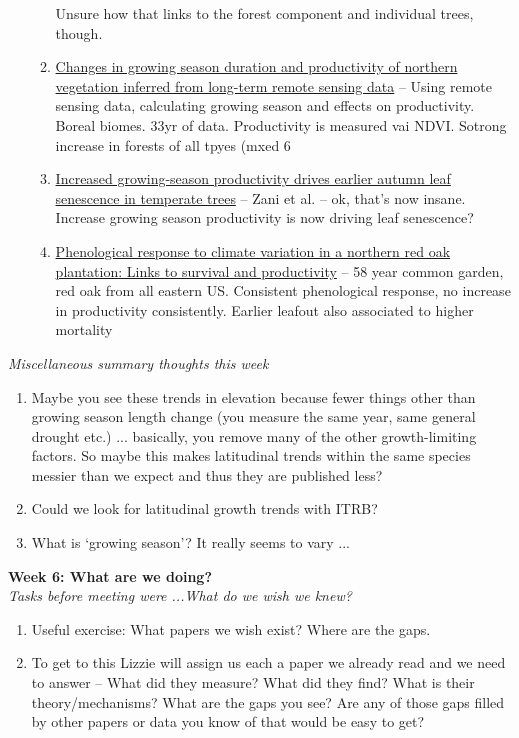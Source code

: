 \documentclass[11pt,letter]{article}
\begin{document}
\begin{enumerate}
\begin{enumerate}
Unsure how that links to the forest component and individual trees, though.
\item \href{https://iopscience.iop.org/article/10.1088/1748-9326/11/8/084001/meta}{Changes in growing season duration and productivity of northern vegetation inferred from long-term remote sensing data} -- Using remote sensing data, calculating growing season and effects on productivity. Boreal biomes. 33yr of data. 
Productivity is measured vai NDVI. Sotrong increase in forests of all tpyes (mxed 6%
\item \href{https://www.science.org/doi/10.1126/science.abd8911}{Increased growing-season productivity drives earlier autumn leaf senescence in temperate trees} -- Zani et al. -- 
ok, that's now insane. Increase growing season productivity is now driving leaf senescence?
\item \href{https://esajournals.onlinelibrary.wiley.com/doi/epdf/10.1002/ecy.3940?saml_referrer}{Phenological response to climate variation in a northern red oak plantation: Links to survival and productivity} -- 58 year common garden, red oak from all eastern US. Consistent phenological response, no increase in productivity consistently. 
Earlier leafout also associated to higher mortality
\end{enumerate}
\end{enumerate}

\emph{Miscellaneous summary thoughts this week}
\begin{enumerate}
\item Maybe you see these trends in elevation because fewer things other than growing season length change (you measure the same year, same general drought etc.) ... basically, you remove many of the other growth-limiting factors. So maybe this makes latitudinal trends within the same species messier than we expect and thus they are published less?
\item Could we look for latitudinal growth trends with ITRB?
\item What is `growing season'? It really seems to vary ... 
\end{enumerate}

\vspace{3ex}

{\bf Week 6: What are we doing?}\\

\emph{Tasks before meeting were ...What do we wish we knew?}
\begin{enumerate}
\item Useful exercise: What papers we wish exist? Where are the gaps. 
\item To get to this Lizzie will assign us each a paper we already read and we need to answer -- What did they measure? What did they find? What is their theory/mechanisms? What are the gaps you see? Are any of those gaps filled by other papers or data you know of that would be easy to get? 
\end{enumerate}
\end{document}
